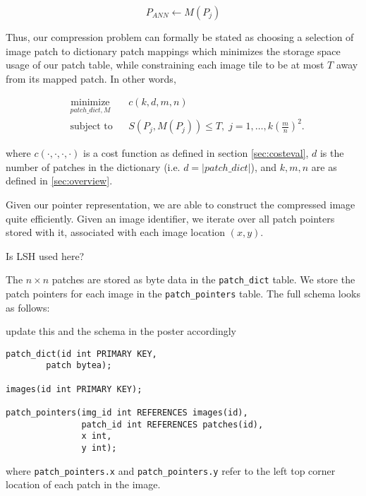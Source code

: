 \begin{equation*}
P_{ANN} \leftarrow M(P_j)
\end{equation*}

Thus, our compression problem can formally be stated as choosing a selection of image patch to dictionary patch mappings which minimizes the storage space usage of our patch table, while constraining each image tile to be at most $T$ away from its mapped patch.  In other words,

\begin{equation*}
\begin{aligned}
& \underset{patch\_dict, M}{\text{minimize}}
& & c(k, d, m, n) \\
& \text{subject to}
& & S(P_j, M(P_j)) \leq T, \; j = 1, \ldots, k\left(\frac{m}{n}\right)^2.
\end{aligned}
\end{equation*}

where $c(\cdot, \cdot, \cdot, \cdot)$ is a cost function as defined in section \ref{sec:costeval}, $d$ is the number of patches in the dictionary (i.e. $d = |patch\_dict|$), and $k,m,n$ are as defined in \ref{sec:overview}.

Given our pointer representation, we are able to construct the compressed image quite efficiently.  Given an image identifier, we iterate over all patch pointers stored with it, associated with each image location $(x,y)$.  
\begin{edit}
Is LSH used here?
\end{edit}


The $n \times n$ patches are stored as byte data in the \texttt{patch\_dict} table.
We store the patch pointers for
each image in the \texttt{patch\_pointers} table. The full schema looks as follows: 
\begin{edit}
update this and the schema in the poster accordingly
\end{edit}
\begin{verbatim}
patch_dict(id int PRIMARY KEY,
        patch bytea);

images(id int PRIMARY KEY);

patch_pointers(img_id int REFERENCES images(id),
               patch_id int REFERENCES patches(id),
               x int,
               y int);
\end{verbatim}
where \texttt{patch\_pointers.x} and \texttt{patch\_pointers.y}
refer to the left top corner location of each patch in the image.


